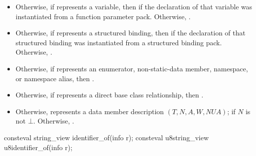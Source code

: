 \begin{itemdescr}
\begin{itemize}
   if
  \begin{itemize}
  \item
    there is a declaration $D$ in $S$ that introduces a name $N$ for either $P$
    or the parameter corresponding to $P$
    in the templated function that $D$ declares and
  \item
    no declaration in $S$ does so using any name other than $N$.
  \end{itemize}
  Otherwise, .
  \begin{example}
\begin{codeblock}
void fun(int);
constexpr std::meta::info r = parameters_of(^^fun)[0];
static_assert(!has_identifier(r));

void fun(int x);
static_assert(has_identifier(r));

void fun(int x);
static_assert(has_identifier(r));

void poison() {
  void fun(int y);
}
static_assert(!has_identifier(r));
\end{codeblock}
  \end{example}
\item
  Otherwise, if  represents a variable,
  then  if the declaration of that variable
  was instantiated from a function parameter pack.
  Otherwise, .
\item
  Otherwise, if  represents a structured binding,
  then  if the declaration of that structured binding
  was instantiated from a structured binding pack.
  Otherwise, .
\item
  Otherwise, if  represents an
  enumerator,
  non-static-data member,
  namespace, or
  namespace alias,
  then .
\item
  Otherwise, if  represents a direct base class relationship,
  then .
\item
  Otherwise,  represents a data member description
  $(T, N, A, W, \mathit{NUA})$;
   if $N$ is not $\bot$.
  Otherwise, .
\end{itemize}
\end{itemdescr}

%
%
\begin{itemdecl}
consteval string_view identifier_of(info r);
consteval u8string_view u8identifier_of(info r);
\end{itemdecl}

